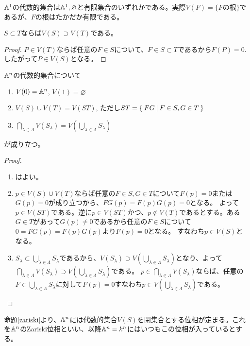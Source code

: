 \documentclass{ltjsreport}
\begin{document}
\begin{eg}
  $\mathbb{A}^1$の代数的集合は$\mathbb{A}^1,\varnothing$と有限集合のいずれかである。実際$V(F)=\{\text{$F$の根}\}$であるが、$F$の根はたかだか有限である。
\end{eg}


\begin{prop}\label{containment1}
  $S\subset T$ならば$V(S)\supset V(T)$である。
\end{prop}

\begin{proof}
  $P\in V(T)$ならば任意の$F\in S$について、$F\in S\subset T$であるから$F(P)=0$. したがって$P\in V(S)$となる。
\end{proof}

\begin{prop}\label{zariski}
  $\mathbb{A}^n$の代数的集合について
  \begin{enumerate}
    \item $V(0)=\mathbb{A}^n$, $V(1)=\varnothing$
    \item $V(S)\cup V(T)=V(ST)$, ただし$ST=\left\{\:FG\:\middle|\:F\in S, G\in T\:\right\}$
    \item $\bigcap_{\lambda\in\Lambda}V(S_\lambda)=V(\bigcup_{\lambda\in\Lambda}S_\lambda)$
  \end{enumerate}
  が成り立つ。
\end{prop}

\begin{proof}
  \begin{enumerate}
    \item はよい。
    \item $p\in V(S)\cup V(T)$ならば任意の$F\in S, G\in T$について$F(p)=0$または$G(p)=0$が成り立つから、$FG(p)=F(p)G(p)=0$となる。
    よって$p\in V(ST)$である。逆に$p\in V(ST)$かつ、$p\notin V(T)$であるとする。ある$G\in T$があって$G(p)\neq 0$であるから任意の$F\in S$について$0=FG(p)=F(p)G(p)$より$F(p)=0$となる。 すなわち$p\in V(S)$となる。
    \item $S_\lambda\subset \bigcup_{\lambda\in\Lambda} S_\lambda$であるから、$V(S_\lambda)\supset V(\bigcup_{\lambda\in\Lambda}S_\lambda)$となり、よって$\bigcap_{\lambda\in\Lambda} V(S_\lambda)\supset V(\bigcup_{\lambda\in\Lambda} S_\lambda)$である。 $p\in\bigcap_{\lambda\in\Lambda}V(S_\lambda)$ならば、任意の$F\in\bigcup_{\lambda\in\Lambda}S_\lambda$に対して$F(p)=0$すなわち$p\in V(\bigcup_{\lambda\in\Lambda}S_\lambda)$である。
  \end{enumerate}
\end{proof}

命題\ref{zariski}より、$\mathbb{A}^n$には代数的集合$V(S)$を閉集合とする位相が定まる。これを$\mathbb{A}^n$のZariski位相といい、以降$\mathbb{A}^n=k^n$にはいつもこの位相が入っているとする。
\end{document}
